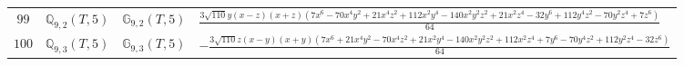 \documentclass[fleqn,8pt,landscape]{jsarticle}
\begin{document}
\begin{table}[ht!]
\begin{center}
\begin{tabular}{cccl}
$ 99 $ & $ \mathbb{Q}_{9,2}(T,5) $ & $ \mathbb{G}_{9,2}(T,5) $ & $ \frac{3 \sqrt{110} y \left(x - z\right) \left(x + z\right) \left(7 x^{6} - 70 x^{4} y^{2} + 21 x^{4} z^{2} + 112 x^{2} y^{4} - 140 x^{2} y^{2} z^{2} + 21 x^{2} z^{4} - 32 y^{6} + 112 y^{4} z^{2} - 70 y^{2} z^{4} + 7 z^{6}\right)}{64} $ \\
$ 100 $ & $ \mathbb{Q}_{9,3}(T,5) $ & $ \mathbb{G}_{9,3}(T,5) $ & $ - \frac{3 \sqrt{110} z \left(x - y\right) \left(x + y\right) \left(7 x^{6} + 21 x^{4} y^{2} - 70 x^{4} z^{2} + 21 x^{2} y^{4} - 140 x^{2} y^{2} z^{2} + 112 x^{2} z^{4} + 7 y^{6} - 70 y^{4} z^{2} + 112 y^{2} z^{4} - 32 z^{6}\right)}{64} $ \\
 \hline \hline
\end{tabular}
\end{center}
\end{table}
\end{document}
